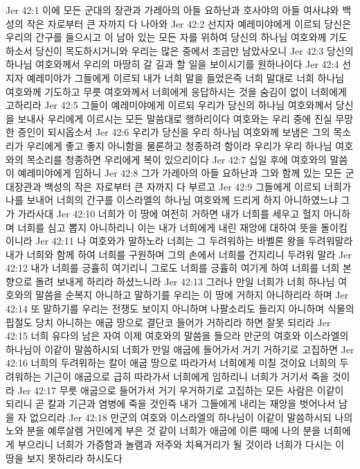 Jer 42:1  이에 모든 군대의 장관과 가레아의 아들 요하난과 호사야의 아들 여사냐와 백성의 작은 자로부터 큰 자까지 다 나아와
Jer 42:2  선지자 예레미야에게 이르되 당신은 우리의 간구를 들으시고 이 남아 있는 모든 자를 위하여 당신의 하나님 여호와께 기도하소서 당신이 목도하시거니와 우리는 많은 중에서 조금만 남았사오니
Jer 42:3  당신의 하나님 여호와께서 우리의 마땅히 갈 길과 할 일을 보이시기를 원하나이다
Jer 42:4  선지자 예레미야가 그들에게 이르되 내가 너희 말을 들었은즉 너희 말대로 너희 하나님 여호와께 기도하고 무릇 여호와께서 너희에게 응답하시는 것을 숨김이 없이 너희에게 고하리라
Jer 42:5  그들이 예레미야에게 이르되 우리가 당신의 하나님 여호와께서 당신을 보내사 우리에게 이르시는 모든 말씀대로 행하리이다 여호와는 우리 중에 진실 무망한 증인이 되시옵소서
Jer 42:6  우리가 당신을 우리 하나님 여호와께 보냄은 그의 목소리가 우리에게 좋고 좋지 아니함을 물론하고 청종하려 함이라 우리가 우리 하나님 여호와의 목소리를 청종하면 우리에게 복이 있으리이다
Jer 42:7  십일 후에 여호와의 말씀이 예레미야에게 임하니
Jer 42:8  그가 가레아의 아들 요하난과 그와 함께 있는 모든 군대장관과 백성의 작은 자로부터 큰 자까지 다 부르고
Jer 42:9  그들에게 이르되 너희가 나를 보내어 너희의 간구를 이스라엘의 하나님 여호와께 드리게 하지 아니하였느냐 그가 가라사대
Jer 42:10  너희가 이 땅에 여전히 거하면 내가 너희를 세우고 헐지 아니하며 너희를 심고 뽑지 아니하리니 이는 내가 너희에게 내린 재앙에 대하여 뜻을 돌이킴이니라
Jer 42:11  나 여호와가 말하노라 너희는 그 두려워하는 바벨론 왕을 두려워말라 내가 너희와 함께 하여 너희를 구원하며 그의 손에서 너희를 건지리니 두려워 말라
Jer 42:12  내가 너희를 긍휼히 여기리니 그로도 너희를 긍휼히 여기게 하여 너희를 너희 본향으로 돌려 보내게 하리라 하셨느니라
Jer 42:13  그러나 만일 너희가 너희 하나님 여호와의 말씀을 순복지 아니하고 말하기를 우리는 이 땅에 거하지 아니하리라 하며
Jer 42:14  또 말하기를 우리는 전쟁도 보이지 아니하며 나팔소리도 들리지 아니하며 식물의 핍절도 당치 아니하는 애굽 땅으로 결단코 들어가 거하리라 하면 잘못 되리라
Jer 42:15  너희 유다의 남은 자여 이제 여호와의 말씀을 들으라 만군의 여호와 이스라엘의 하나님이 이같이 말씀하시되 너희가 만일 애굽에 들어가서 거기 거하기로 고집하면
Jer 42:16  너희의 두려워하는 칼이 애굽 땅으로 따라가서 너희에게 미칠 것이요 너희의 두려워하는 기근이 애굽으로 급히 따라가서 너희에게 임하리니 너희가 거기서 죽을 것이라
Jer 42:17  무릇 애굽으로 들어가서 거기 우거하기로 고집하는 모든 사람은 이같이 되리니 곧 칼과 기근과 염병에 죽을 것인즉 내가 그들에게 내리는 재앙을 벗어나서 남을 자 없으리라
Jer 42:18  만군의 여호와 이스라엘의 하나님이 이같이 말씀하시되 나의 노와 분을 예루살렘 거민에게 부은 것 같이 너희가 애굽에 이른 때에 나의 분을 너희에게 부으리니 너희가 가증함과 놀램과 저주와 치욕거리가 될 것이라 너희가 다시는 이 땅을 보지 못하리라 하시도다
